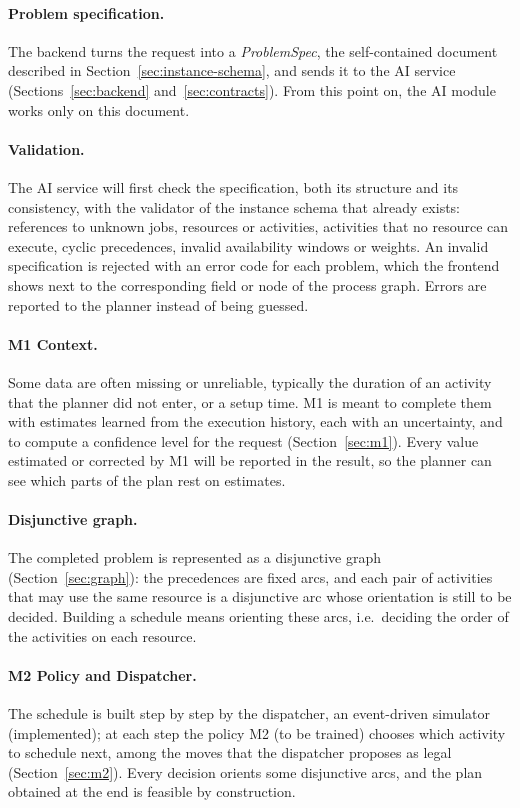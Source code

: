 \paragraph{Problem specification.} The backend turns the request into a \emph{ProblemSpec}, the
self-contained document described in Section~\ref{sec:instance-schema}, and sends it to the AI
service (Sections~\ref{sec:backend} and~\ref{sec:contracts}). From this point on, the AI module
works only on this document.

\paragraph{Validation.} The AI service will first check the specification, both its structure
and its consistency, with the validator of the instance schema that already exists: references to unknown jobs, resources or activities, activities that no
resource can execute, cyclic precedences, invalid availability windows or weights. An invalid
specification is rejected with an error code for each problem, which the frontend shows next to
the corresponding field or node of the process graph. Errors are reported to the planner instead
of being guessed.

\paragraph{M1 Context.} Some data are often missing or unreliable, typically the duration of an
activity that the planner did not enter, or a setup time. M1 is meant to complete them with
estimates learned from the execution history, each with an uncertainty, and to compute a
confidence level for the request (Section~\ref{sec:m1}). Every value estimated or corrected by M1
will be reported in the result, so the planner can see which parts of the plan rest on
estimates.

\paragraph{Disjunctive graph.} The completed problem is represented as a disjunctive graph
(Section~\ref{sec:graph}): the precedences are fixed arcs, and each pair of activities that may
use the same resource is a disjunctive arc whose orientation is still to be decided. Building a
schedule means orienting these arcs, i.e.\ deciding the order of the activities on each
resource.

\paragraph{M2 Policy and Dispatcher.} The schedule is built step by step by the dispatcher, an
event-driven simulator (implemented); at each step the policy M2 (to be trained) chooses which
activity to schedule next, among the moves that the dispatcher proposes as legal
(Section~\ref{sec:m2}). Every decision
orients some disjunctive arcs, and the plan obtained at the end is feasible by construction.

